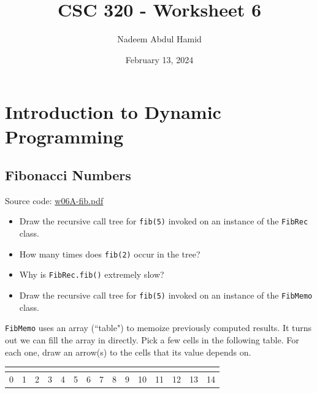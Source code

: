 \documentclass[12pt]{article}
\title{CSC 320 - Worksheet 6}
\author{Nadeem Abdul Hamid}
\date{February 13, 2024}
\begin{document}
\section{Introduction to Dynamic Programming}
\subsection{Fibonacci Numbers}

Source code: \url{w06A-fib.pdf}

\begin{itemize}
    \item Draw the recursive call tree for \verb+fib(5)+ invoked on an instance of the \verb+FibRec+ class.
    \item How many times does \verb+fib(2)+ occur in the tree?
    \item Why is \verb+FibRec.fib()+ extremely slow?
\end{itemize}
\vspace{3.5in}

\begin{itemize}
    \item Draw the recursive call tree for \verb+fib(5)+ invoked on an instance of the \verb+FibMemo+ class.
\end{itemize}
\vspace{4in}

\clearpage

\verb+FibMemo+ uses an array (``table") to memoize previously computed results. It turns out we can fill the array in directly. Pick a few cells in the following table. For each one, draw an arrow(s) to the cells that its value depends on.
\vspace{2em}

\begin{minipage}{1.0\textwidth}\centering
        \begin{tabular}{lllllllllllllll}
        \hline
        \multicolumn{1}{|l|}{} & \multicolumn{1}{l|}{} & \multicolumn{1}{l|}{} & \multicolumn{1}{l|}{} & \multicolumn{1}{l|}{} & \multicolumn{1}{l|}{} & \multicolumn{1}{l|}{} & \multicolumn{1}{l|}{} & \multicolumn{1}{l|}{} & \multicolumn{1}{l|}{} & \multicolumn{1}{l|}{} & \multicolumn{1}{l|}{} & \multicolumn{1}{l|}{} & \multicolumn{1}{l|}{} & \multicolumn{1}{l|}{} \\ \hline
        0                      & 1                     & 2                     & 3                     & 4                     & 5                     & 6                     & 7                     & 8                     & 9                     & 10                    & 11                    & 12                    & 13                    & 14                   
        \end{tabular}
\end{minipage}%
  
\end{document}
